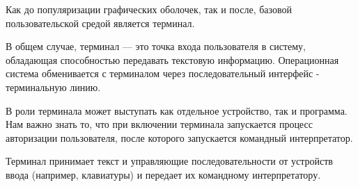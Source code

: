 Как до популяризации графических оболочек, так и после, базовой пользовательской средой является терминал.

В общем случае, терминал --- это точка входа пользователя в систему, обладающая способностью передавать текстовую информацию. Операционная система обменивается с терминалом через последовательный интерфейс - терминальную линию.

В роли терминала может выступать как отдельное устройство, так и программа. Нам важно знать то, что при включении терминала запускается процесс авторизации пользователя, после которого запускается командный интерпретатор.

Терминал принимает текст и управляющие последовательности от устройств ввода (например, клавиатуры) и передает их командному интерпретатору.